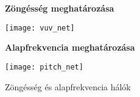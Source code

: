 \begin{figure}[h]
\begin{minipage}{0.45\textwidth}
	\begin{center}
		\textbf{Zöngésség meghatározása}\par\medskip
		\texttt{[image: vuv\_net]}
	\end{center}
\end{minipage}
\begin{minipage}{0.45\textwidth}
	\begin{center}
		\textbf{Alapfrekvencia meghatározása}\par\medskip
		\texttt{[image: pitch\_net]}
	\end{center}
\end{minipage}
\caption{Zöngésség és alapfrekvencia hálók}
\end{figure}
\begin{comment}
regi reszek

A továbbiakban egy DNN modell alkalmazása olvasható. A megismert címkéket továbbiakkal egészítettük ki, majd ez alapján generáltunk gerjesztési és spektrális paramétereket, amikből előállítható az audio.





Előrecsatolt mély neurális hálózatot építettünk fel, 6 rejtett réteggel, tanh és sigmoid aktivációs függvényekkel, SGD optimalizálóval és MSE költségfüggvénnyel. A háló rétegeire Dropoutot is használtunk. (/!TODO ref)
A megállást early stoppinggal detektáltuk.

/!TODO háló modell kép

\end{comment}

